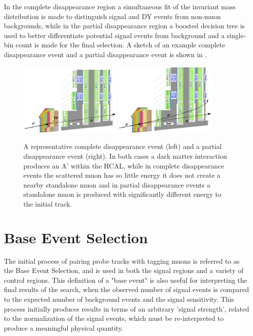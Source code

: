 In the complete disappearance region a simultaneous fit of the invariant mass distribution is made to distinguish signal and DY events from non-muon backgrounds, while in the partial disappearance region a boosted decision tree is used to better differentiate potential signal events from background and a single-bin count is made for the final selection.
A sketch of an example complete disappearance event and a partial disappearance event is shown in .

\begin{figure}[htpb]
	\centering
	\includegraphics[width=0.45\textwidth]{figures/comp_dis.pdf}
	\hspace{0.01\textwidth}
	\includegraphics[width=0.45\textwidth]{figures/part_dis.pdf}
	\caption[Example Complete and Partial Disappearance Events]{A representative complete disappearance event (left) and a partial disappearance event (right). In both cases a dark matter interaction produces an A' within the HCAL, while in complete disappearance events the scattered muon has so little energy it does not create a nearby standalone muon and in partial disappearance events a standalone muon is produced with significantly different energy to the initial track.}
	\label{fig:sigCatSketch}
\end{figure}

\section{Base Event Selection}
The initial process of pairing probe tracks with tagging muons is referred to as the Base Event Selection, and is used in both the signal regions and a variety of control regions.
This definition of a "base event" is also useful for interpreting the final results of the search, when the observed number of signal events is compared to the expected number of background events and the signal sensitivity.
This process initially produces results in terms of an arbitrary 'signal strength', related to the normalization of the signal events, which must be re-interpreted to produce a meaningful physical quantity.

